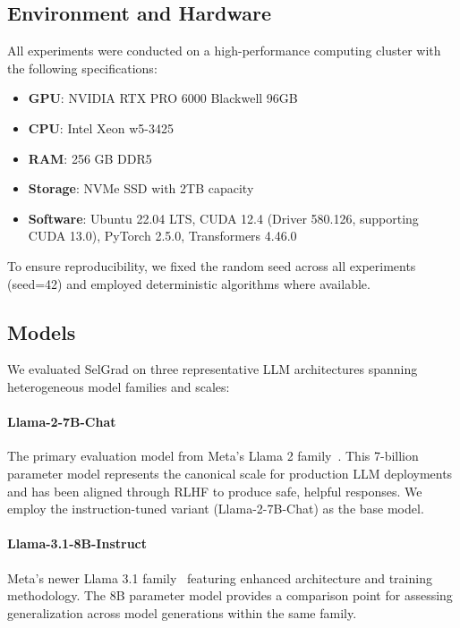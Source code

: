 \subsection{Environment and Hardware}
\label{subsec:environment}

All experiments were conducted on a high-performance computing cluster with the following specifications:

\begin{itemize}
    \item \textbf{GPU}: NVIDIA RTX PRO 6000 Blackwell 96GB
    \item \textbf{CPU}: Intel Xeon w5-3425
    \item \textbf{RAM}: 256 GB DDR5
    \item \textbf{Storage}: NVMe SSD with 2TB capacity
    \item \textbf{Software}: Ubuntu 22.04 LTS, CUDA 12.4 (Driver 580.126, supporting CUDA 13.0), PyTorch 2.5.0, Transformers 4.46.0
\end{itemize}

To ensure reproducibility, we fixed the random seed across all experiments (seed=42) and employed deterministic algorithms where available.

\subsection{Models}
\label{subsec:models}

We evaluated SelGrad on three representative LLM architectures spanning heterogeneous model families and scales:

\paragraph{Llama-2-7B-Chat}
The primary evaluation model from Meta's Llama 2 family~\cite{touvron2023llama}. This 7-billion parameter model represents the canonical scale for production LLM deployments and has been aligned through RLHF to produce safe, helpful responses. We employ the instruction-tuned variant (Llama-2-7B-Chat) as the base model.

\paragraph{Llama-3.1-8B-Instruct}
Meta's newer Llama 3.1 family~\cite{grattafiori2024llama3} featuring enhanced architecture and training methodology. The 8B parameter model provides a comparison point for assessing generalization across model generations within the same family.

